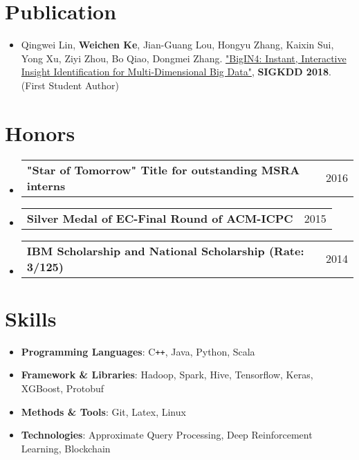 \documentclass[a4paper,11pt]{article}
\makeatletter
\newcommand{\resumeItem}[1]{
  \item\small{#1 \vspace{-2pt}}
}
\newcommand{\resumeMiniheading}[2]{
  \vspace{-1pt}\item
    \begin{tabular*}{0.97\textwidth}{l@{\extracolsep{\fill}}r}
      \textbf{#1} & #2
    \end{tabular*}
}
\makeatother
\begin{document}
\section{Publication}
  \begin{itemize}[leftmargin=*, itemsep=0pt, label={}]
    \resumeItem 
    {Qingwei Lin, \textbf{Weichen Ke}, Jian-Guang Lou, Hongyu Zhang, Kaixin Sui, Yong Xu, Ziyi Zhou, Bo Qiao, Dongmei Zhang. \href{http://www.kdd.org/kdd2018/accepted-papers/view/bigin4-instant-interactive-insight-identification-for-multi-dimensional-big}{"BigIN4: Instant, Interactive Insight Identification for Multi-Dimensional Big Data"}, \textbf{SIGKDD 2018}.  (First Student Author) }
  \end{itemize}

\section{Honors}
  \begin{itemize}[leftmargin=*, itemsep=-1pt, label={}]
    \resumeMiniheading{"Star of Tomorrow" Title for outstanding MSRA interns \normalfont{(Rate: 10\%)}}{2016}
    \resumeMiniheading{Silver Medal of EC-Final Round of ACM-ICPC}{2015}
    \resumeMiniheading{IBM Scholarship and National Scholarship {\normalfont(Rate: 3/125)}}{2014}
  \end{itemize}

\section{Skills}
  \begin{itemize}[leftmargin=*, itemsep=-2pt, label={}]
    \item{
      \textbf{Programming Languages}{: C\texttt{++}, Java, Python, Scala}
    }
    \item{
      \textbf{Framework \& Libraries}{: Hadoop, Spark, Hive, Tensorflow, Keras, XGBoost, Protobuf}
    }
    \item{
      \textbf{Methods \& Tools}{: Git, Latex, Linux}
    }
    \item{
      \textbf{Technologies}{: Approximate Query Processing, Deep Reinforcement Learning, Blockchain}
    }
  \end{itemize}


\end{document}
